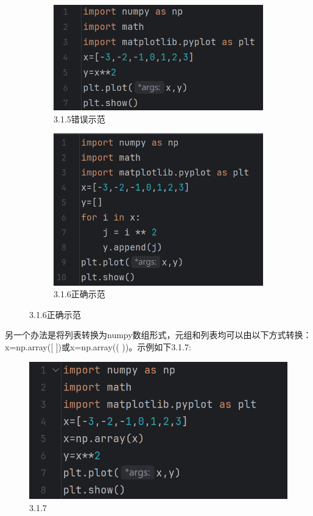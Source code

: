 \documentclass[12pt]{article}
\begin{document}
\begin{figure}[H]
    \centering
    \begin{subfigure}[b]{0.45\textwidth}
        \includegraphics[width=1.2\textwidth,height=0.6\textwidth]{线图 错误示范1.png}
        \caption{3.1.5错误示范}
        \label{fig:enter-label-1}
    
    \end{subfigure}
    \hfill        
    \begin{subfigure}[b]{0.45\textwidth}
        \includegraphics[width=\textwidth]{线图 正确示范1.png}
        \caption{3.1.6正确示范}
        \label{fig:enter-label-2}
    \end{subfigure}
\end{figure}
另一个办法是将列表转换为numpy数组形式，元组和列表均可以由以下方式转换：x=np.array([ ])或x=np.array(( ))。示例如下3.1.7:
\begin{figure}[H]
    \centering
    \includegraphics[width=0.6\linewidth]{转array示范.png}
    \caption{3.1.7}
    \label{fig:enter-label}
\end{figure}
\end{document}

